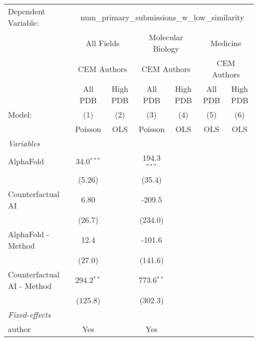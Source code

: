 \begingroup
\centering
\begin{tabular}{lcccccc}
   \tabularnewline \midrule \midrule
   Dependent Variable: & \multicolumn{6}{c}{num\_primary\_submissions\_w\_low\_similarity}\\
 & \multicolumn{2}{c}{All Fields} & \multicolumn{2}{c}{Molecular Biology} & \multicolumn{2}{c}{Medicine} \\
\cmidrule(lr){2-3} \cmidrule(lr){4-5} \cmidrule(lr){6-7}
 & \multicolumn{2}{c}{CEM Authors} & \multicolumn{2}{c}{CEM Authors} & \multicolumn{2}{c}{CEM Authors} \\
\cmidrule(lr){2-3} \cmidrule(lr){4-5} \cmidrule(lr){6-7}
 & \multicolumn{1}{c}{All PDB} & \multicolumn{1}{c}{High PDB} & \multicolumn{1}{c}{All PDB} & \multicolumn{1}{c}{High PDB} & \multicolumn{1}{c}{All PDB} & \multicolumn{1}{c}{High PDB} \\
\cmidrule(lr){2-2} \cmidrule(lr){3-3} \cmidrule(lr){4-4} \cmidrule(lr){5-5} \cmidrule(lr){6-6} \cmidrule(lr){7-7}
   Model:                     & (1)          & (2)  & (3)           & (4)  & (5)  & (6)\\  
                              &  Poisson     & OLS  & Poisson       & OLS  & OLS  & OLS\\  
   \midrule
   \emph{Variables}\\
   AlphaFold                  & 34.0$^{***}$ &      & 194.3$^{***}$ &      &      &   \\   
                              & (5.26)       &      & (35.4)        &      &      &   \\   
   Counterfactual AI          & 6.80         &      & -209.5        &      &      &   \\   
                              & (26.7)       &      & (234.0)       &      &      &   \\   
   AlphaFold - Method         & 12.4         &      & -101.6        &      &      &   \\   
                              & (27.0)       &      & (141.6)       &      &      &   \\   
   Counterfactual AI - Method & 294.2$^{**}$ &      & 773.6$^{**}$  &      &      &   \\   
                              & (125.8)      &      & (302.3)       &      &      &   \\   
   \midrule
   \emph{Fixed-effects}\\
   author                     & Yes          &      & Yes           &      &      & \\  

\end{tabular}
